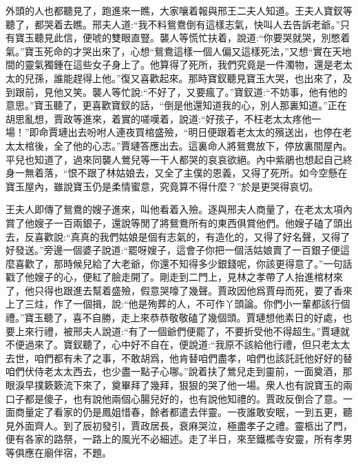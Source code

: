 \begin{parag}
    外頭的人也都聽見了，跑進來一瞧，大家嚷着報與邢王二夫人知道。王夫人寶釵等聽了，都哭着去瞧。邢夫人道:“我不料鴛鴦倒有這樣志氣，快叫人去告訴老爺。”只有寶玉聽見此信，便唬的雙眼直豎。襲人等慌忙扶着，說道:“你要哭就哭，別憋着氣。”寶玉死命的才哭出來了，心想“鴛鴦這樣一個人偏又這樣死法，”又想“實在天地間的靈氣獨鍾在這些女子身上了。他算得了死所，我們究竟是一件濁物，還是老太太的兒孫，誰能趕得上他。”復又喜歡起來。那時寶釵聽見寶玉大哭，也出來了，及到跟前，見他又笑。襲人等忙說:“不好了，又要瘋了。”寶釵道:“不妨事，他有他的意思。”寶玉聽了，更喜歡寶釵的話，“倒是他還知道我的心，別人那裏知道。”正在胡思亂想，賈政等進來，着實的嗟嘆着，說道:“好孩子，不枉老太太疼他一場！”即命賈璉出去吩咐人連夜買棺盛殮，“明日便跟着老太太的殯送出，也停在老太太棺後，全了他的心志。”賈璉答應出去。這裏命人將鴛鴦放下，停放裏間屋內。平兒也知道了，過來同襲人鶯兒等一干人都哭的哀哀欲絕。內中紫鵑也想起自己終身一無着落，“恨不跟了林姑娘去，又全了主僕的恩義，又得了死所。如今空懸在寶玉屋內，雖說寶玉仍是柔情蜜意，究竟算不得什麼？”於是更哭得哀切。
\end{parag}


\begin{parag}
    王夫人即傳了鴛鴦的嫂子進來，叫他看着入殮。逐與邢夫人商量了，在老太太項內賞了他嫂子一百兩銀子，還說等閒了將鴛鴦所有的東西俱賞他們。他嫂子磕了頭出去，反喜歡說:“真真的我們姑娘是個有志氣的，有造化的，又得了好名聲，又得了好發送。”旁邊一個婆子說道:“罷呀嫂子，這會子你把一個活姑娘賣了一百銀子便這麼喜歡了，那時候兒給了大老爺，你還不知得多少銀錢呢，你該更得意了。”一句話戳了他嫂子的心，便紅了臉走開了。剛走到二門上，見林之孝帶了人抬進棺材來了，他只得也跟進去幫着盛殮，假意哭嚎了幾聲。賈政因他爲賈母而死，要了香來上了三炷，作了一個揖，說:“他是殉葬的人，不可作丫頭論。你們小一輩都該行個禮。”寶玉聽了，喜不自勝，走上來恭恭敬敬磕了幾個頭。賈璉想他素日的好處，也要上來行禮，被邢夫人說道:“有了一個爺們便罷了，不要折受他不得超生。”賈璉就不便過來了。寶釵聽了，心中好不自在，便說道:“我原不該給他行禮，但只老太太去世，咱們都有未了之事，不敢胡爲，他肯替咱們盡孝，咱們也該託託他好好的替咱們伏侍老太太西去，也少盡一點子心哪。”說着扶了鶯兒走到靈前，一面奠酒，那眼淚早撲簌簌流下來了，奠畢拜了幾拜，狠狠的哭了他一場。衆人也有說寶玉的兩口子都是傻子，也有說他兩個心腸兒好的，也有說他知禮的。賈政反倒合了意。一面商量定了看家的仍是鳳姐惜春，餘者都遣去伴靈。一夜誰敢安眠，一到五更，聽見外面齊人。到了辰初發引，賈政居長，衰麻哭泣，極盡孝子之禮。靈柩出了門，便有各家的路祭，一路上的風光不必細述。走了半日，來至鐵檻寺安靈，所有孝男等俱應在廟伴宿，不題。
\end{parag}


